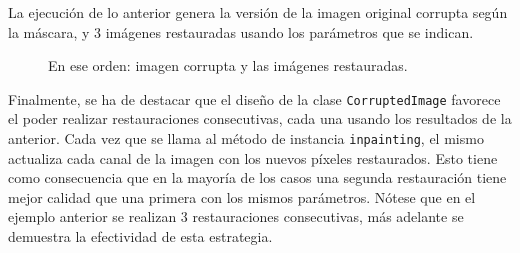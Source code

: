 La ejecuci\'on de lo anterior genera la versi\'on de la imagen original corrupta seg\'un la m\'ascara, y 3 im\'agenes restauradas usando los par\'ametros que se indican.
\begin{figure}[H]
	\centering
	\caption{En ese orden: imagen corrupta y las im\'agenes restauradas.}
	\label{fig:inpainting_woman_blonde}
\end{figure}
Finalmente, se ha de destacar que el diseño de la clase \texttt{CorruptedImage} favorece el poder realizar restauraciones consecutivas, cada una usando los resultados de la anterior. Cada vez que se llama al m\'etodo de instancia \texttt{inpainting}, el mismo actualiza cada canal de la imagen con los nuevos p\'ixeles restaurados. Esto tiene como consecuencia que en la mayor\'ia de los casos una segunda restauraci\'on tiene mejor calidad que una primera con los mismos par\'ametros. N\'otese que en el ejemplo anterior se realizan 3 restauraciones consecutivas, m\'as adelante se demuestra la efectividad de esta estrategia.

